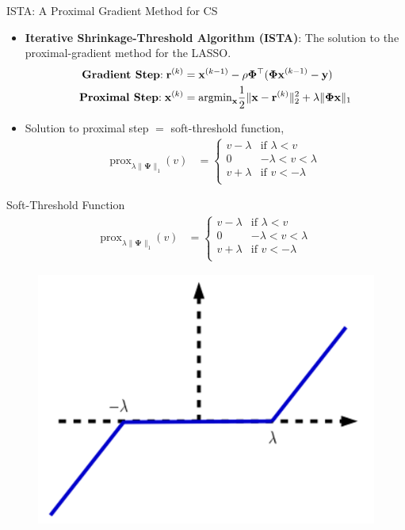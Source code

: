 \documentclass{beamer}
\begin{document}
  \begin{frame}{ISTA: A Proximal Gradient Method for CS}
    \begin{itemize}
      \item \textbf{Iterative Shrinkage-Threshold Algorithm (ISTA)}: The solution to the proximal-gradient method for the LASSO.
      \begin{align}
        \text{\textbf{Gradient Step}:}\;\mathbf{r}^{(k)} &= \mathbf{x}^{(k-1)}-\rho\mathbf{\Phi}^\top (\mathbf{\Phi x}^{(k-1)}-\mathbf{y}) \\
        \text{\textbf{Proximal Step}:}\;\mathbf{x}^{(k)} &= \mathbf {\text{argmin}}_{\mathbf{x}} \frac 12 \|\mathbf{x} - \mathbf{r}^{(k)}\|_2^2+\lambda \|\mathbf{\Phi}\mathbf{x}\|_1
      \end{align}
      \item Solution to proximal step $=$ soft-threshold function,
      \begin{align*}
        \text{prox}_{\lambda\|\mathbf{\Psi}\|_1} (v) &= 
          \begin{cases}
            v - \lambda & \text{if } \lambda < v \\
            0           & -\lambda < v < \lambda \\
            v + \lambda & \text{if } v < -\lambda \\
          \end{cases}
      \end{align*}
    \end{itemize}
  \end{frame}

  \begin{frame}{Soft-Threshold Function}
    \begin{align*}
      \text{prox}_{\lambda\|\mathbf{\Psi}\|_1} (v) &= 
        \begin{cases}
          v - \lambda & \text{if } \lambda < v \\
          0           & -\lambda < v < \lambda \\
          v + \lambda & \text{if } v < -\lambda \\
        \end{cases}
    \end{align*}
    \begin{figure}[htb]
      \centering
      \includegraphics[width=.5\textwidth]{soft-threshold.png}
    \end{figure}
  \end{frame}
\end{document}
